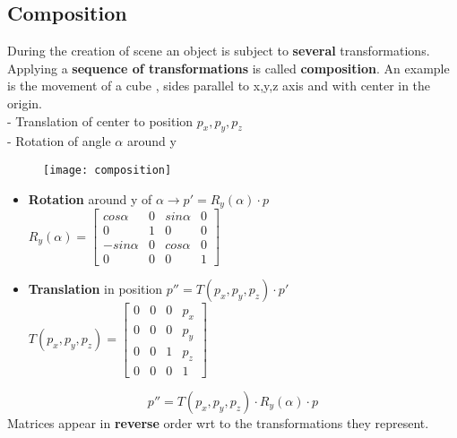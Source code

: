 \subsection{Composition}
During the creation of scene an object is subject to \textbf{several} transformations. Applying a \textbf{sequence of transformations} is called \textbf{composition}.
An example is the movement of a cube , sides parallel to x,y,z axis and with center in the origin.\\
- Translation of center to position $p_x,p_y,p_z$\\
- Rotation of angle $\alpha$ around y\\
\begin{figure}[H]
  \centering
  \texttt{[image: composition]}
\end{figure}
\begin{itemize}
\item \textbf{Rotation} around y of $\alpha \to p'=R_y(\alpha) \cdot p$\\
$	
R_y(\alpha)= \begin{bmatrix}
       cos\alpha & 0 & sin\alpha & 0        \\[0.1em]
       0 & 1 & 0 & 0		    \\[0.1em]
       -sin\alpha & 0 & cos\alpha & 0							\\[0.1em]
       0 & 0 & 0 & 1
     \end{bmatrix} 
$ 
\item \textbf{Translation} in position $p''=T(p_x,p_y,p_z) \cdot p'$\\
$	
T(p_x,p_y,p_z)= \begin{bmatrix}
       0 & 0 & 0 & p_x        \\[0.1em]
       0 & 0 & 0 & p_y	    \\[0.1em]
       0 & 0 & 1 & p_z							\\[0.1em]
       0 & 0 & 0 & 1
     \end{bmatrix} 
$
\end{itemize}
\[
\boxed{p''= T(p_x,p_y,p_z) \cdot R_y(\alpha) \cdot p}
\]
Matrices appear in \textbf{reverse} order wrt to the transformations they represent.
